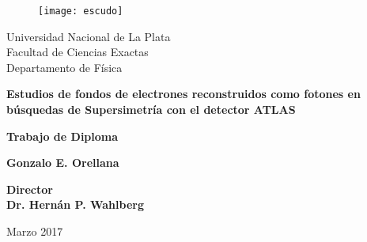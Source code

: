 


\thispagestyle{empty}
\begin{center}

\begin{figure}[h]
\centering
\texttt{[image: escudo]}
\end{figure}

{\large Universidad Nacional de La Plata\\}
{\large Facultad de Ciencias Exactas\\}
{\large Departamento de Física\\}


\vspace{2cm}

\hrulefill

{\bf \huge  Estudios de fondos de electrones reconstruidos como fotones en búsquedas de Supersimetría con el detector ATLAS\\}

\vspace{0.6cm}

\hrulefill

\vspace{0.3cm}

{\large \bf Trabajo de Diploma \\}

\vspace{2.5cm}

{\Large \bf Gonzalo E. Orellana \\}

\vspace{2.5cm}

{\Large\bf Director \\}
{\Large\bf Dr. Hernán P. Wahlberg \\}

\vspace{3cm}

{\large Marzo 2017}

\end{center}



\restoregeometry




